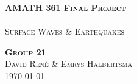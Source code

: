 \begin{titlepage}
\begin{center}
    \vspace*{110mm}
    \fontsize{10mm}{10mm} 
    \textsc{\textbf{AMATH 361 Final Project} \\\hline
    \vspace{4mm} \\
    Surface Waves \& Earthquakes}
\end{center}

\vspace*{45mm}

\begin{center}
    \textsc{
    \huge{\textbf{Group 21}\\}
    \huge{David Ren\'e \& Emrys Halbertsma\\}
    \vspace{4mm}
	\Large{ {\today}}}
\end{center}

\pagebreak

\end{titlepage}
